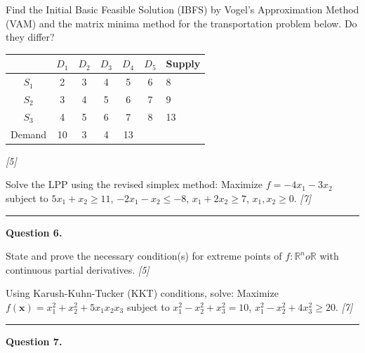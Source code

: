 \documentclass[11pt,a4paper]{article}
\newcommand{\pts}[1]{\hfill   \textit{[#1]}}
\begin{document}
\begin{parts}
  \item Find the Initial Basic Feasible Solution (IBFS) by Vogel's Approximation Method (VAM) and the matrix minima method for the transportation problem below. Do they differ?
  
\begin{center}
  
\begin{tabular}{|ccccc|c}
  \hline
   & $D_1$ & $D_2$ & $D_3$ & $D_4$ & $D_5$ & Supply \\
  \hline
  $S_1$ & 2 & 3 & 4 & 5 & 6 & 8 \\
  $S_2$ & 3 & 4 & 5 & 6 & 7 & 9 \\
  $S_3$ & 4 & 5 & 6 & 7 & 8 & 13 \\
  \hline
  Demand & 10 & 3 & 4 & 13 & & \\
  \hline
  \end{tabular}
  \end{center} \pts{5}
  \item Solve the LPP using the revised simplex method: Maximize $f = -4x_1 - 3x_2$ subject to $5x_1 + x_2 \ge 11$, $-2x_1 - x_2 \le -8$, $x_1 + 2x_2 \ge 7$, $x_1, x_2 \ge 0$. \pts{7}
\end{parts}

\medskip\rule{\linewidth}{0.2pt}

\medskip


\noindent   \textbf{Question 6.}

\begin{parts}
  \item State and prove the necessary condition(s) for extreme points of $f: \mathbb{R}^n  o \mathbb{R}$ with continuous partial derivatives. \pts{5}
  \item Using Karush-Kuhn-Tucker (KKT) conditions, solve: Maximize $f(\mathbf{x}) = x_1^2 + x_2^2 + 5x_1 x_2 x_3$ subject to $x_1^2 - x_2^2 + x_3^2 = 10$, $x_1^2 - x_2^2 + 4x_3^2 \ge 20$. \pts{7}
\end{parts}

\medskip\rule{\linewidth}{0.2pt}

\medskip


\noindent   \textbf{Question 7.}
\end{document}
